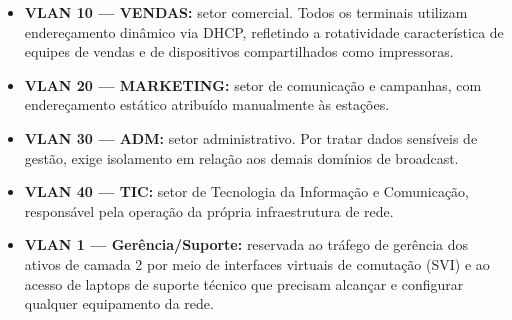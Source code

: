 \begin{itemize}[leftmargin=2em]
  \item \textbf{VLAN 10 --- VENDAS:} setor comercial. Todos os terminais utilizam
        endereçamento dinâmico via DHCP, refletindo a rotatividade característica
        de equipes de vendas e de dispositivos compartilhados como impressoras.

  \item \textbf{VLAN 20 --- MARKETING:} setor de comunicação e campanhas, com
        endereçamento estático atribuído manualmente às estações.

  \item \textbf{VLAN 30 --- ADM:} setor administrativo. Por tratar dados sensíveis
        de gestão, exige isolamento em relação aos demais domínios de broadcast.

  \item \textbf{VLAN 40 --- TIC:} setor de Tecnologia da Informação e Comunicação,
        responsável pela operação da própria infraestrutura de rede.

  \item \textbf{VLAN 1 --- Gerência/Suporte:} reservada ao tráfego de gerência dos
        ativos de camada 2 por meio de interfaces virtuais de comutação (SVI) e ao
        acesso de laptops de suporte técnico que precisam alcançar e configurar
        qualquer equipamento da rede.
\end{itemize}